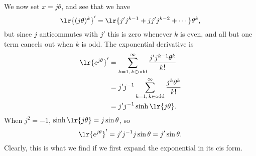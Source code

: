 {We now set \( x = j \theta \), and see that we have
\begin{equation}\label{eqn:dexpquestion:179}
\lr{ (j \theta)^k }' = \lr{ j' j^{k-1} + j j' j^{k-2} + \cdots } \theta^k,
\end{equation}
but since \( j \) anticommutes with \( j' \) this is zero whenever \( k \) is even, and all but one term cancels out when \( k \) is odd.
The exponential derivative is
\begin{equation}\label{eqn:dexpquestion:61}
\begin{aligned}
\lr{e^{j\theta}}'
&= \sum_{k = 1, \, k \in \mathrm{odd}}^\infty \frac{ j' j^{k-1} \theta^k }{k!} \\
&= j' j^{-1} \sum_{k = 1, \, k \in \mathrm{odd}}^\infty \frac{ j^{k} \theta^k }{k!} \\
&= j' j^{-1} \sinh\lr{j\theta}.
\end{aligned}
\end{equation}
When \( j^2 = -1 \), \( \sinh\lr{j\theta} = j \sin\theta \), so
\begin{equation}\label{eqn:dexpquestion:199}
\lr{e^{j\theta}}' = j' j^{-1} j \sin\theta = j' \sin\theta.
\end{equation}
Clearly, this is what we find if we first expand the exponential in its cis form.
} %
